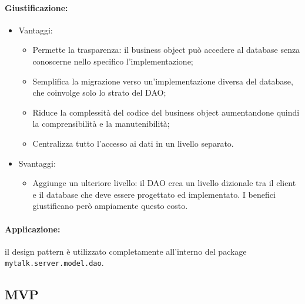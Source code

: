 {{	\paragraph{Giustificazione: }{
	\begin{itemize}
		\item[] {Vantaggi:
	\begin{itemize}
		\item Permette la trasparenza: il business object può accedere al database senza conoscerne nello specifico l'implementazione;
	\item Semplifica la migrazione verso un'implementazione diversa del database, che coinvolge solo lo strato del DAO;
	\item Riduce la complessità del codice del business object aumentandone quindi la comprensibilità e la manutenibilità;
	\item Centralizza tutto l'accesso ai dati in un livello separato.
	\end{itemize}
	}
		\item[] {Svantaggi:
	\begin{itemize}
	\item Aggiunge un ulteriore livello: il DAO crea un livello dizionale tra il client e il database che deve essere progettato ed implementato. I benefici giustificano però ampiamente questo costo.
	\end{itemize}
	}
	\end{itemize}
	}
	\paragraph{Applicazione: }{il design pattern è utilizzato completamente all’interno del package \nolinkurl{mytalk.server.model.dao}.	
	}
}


\subsection{MVP}\label{patternMVP} {
}}
